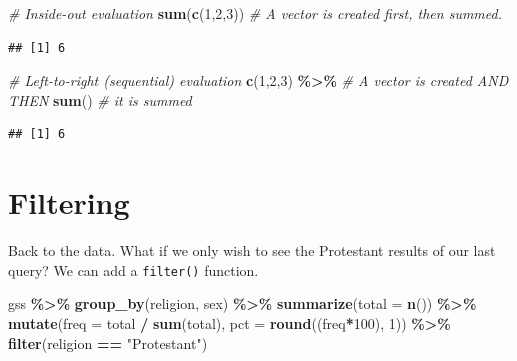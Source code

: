 \documentclass[
]{book}
\newenvironment{Shaded}{\begin{snugshade}}{\end{snugshade}}
\newcommand{\AttributeTok}[1]{\textcolor[rgb]{0.13,0.29,0.53}{#1}}
\newcommand{\CommentTok}[1]{\textcolor[rgb]{0.56,0.35,0.01}{\textit{#1}}}
\newcommand{\DecValTok}[1]{\textcolor[rgb]{0.00,0.00,0.81}{#1}}
\newcommand{\FunctionTok}[1]{\textcolor[rgb]{0.13,0.29,0.53}{\textbf{#1}}}
\newcommand{\NormalTok}[1]{#1}
\newcommand{\SpecialCharTok}[1]{\textcolor[rgb]{0.81,0.36,0.00}{\textbf{#1}}}
\newcommand{\StringTok}[1]{\textcolor[rgb]{0.31,0.60,0.02}{#1}}
\begin{document}
\begin{Shaded}
\begin{Highlighting}[]
\CommentTok{\# Inside{-}out evaluation}
\FunctionTok{sum}\NormalTok{(}\FunctionTok{c}\NormalTok{(}\DecValTok{1}\NormalTok{,}\DecValTok{2}\NormalTok{,}\DecValTok{3}\NormalTok{))               }\CommentTok{\# A vector is created first, then summed.}
\end{Highlighting}
\end{Shaded}

\begin{verbatim}
## [1] 6
\end{verbatim}

\begin{Shaded}
\begin{Highlighting}[]
\CommentTok{\# Left{-}to{-}right (sequential) evaluation}
\FunctionTok{c}\NormalTok{(}\DecValTok{1}\NormalTok{,}\DecValTok{2}\NormalTok{,}\DecValTok{3}\NormalTok{) }\SpecialCharTok{\%\textgreater{}\%}                \CommentTok{\# A vector is created AND THEN}
  \FunctionTok{sum}\NormalTok{()                     }\CommentTok{\# it is summed}
\end{Highlighting}
\end{Shaded}

\begin{verbatim}
## [1] 6
\end{verbatim}

\hypertarget{filtering}{%
\section{Filtering}\label{filtering}}

Back to the data. What if we only wish to see the Protestant results of our last query? We can add a \texttt{filter()} function.

\begin{Shaded}
\begin{Highlighting}[]
\NormalTok{gss }\SpecialCharTok{\%\textgreater{}\%}
  \FunctionTok{group\_by}\NormalTok{(religion, sex) }\SpecialCharTok{\%\textgreater{}\%}
  \FunctionTok{summarize}\NormalTok{(}\AttributeTok{total =} \FunctionTok{n}\NormalTok{()) }\SpecialCharTok{\%\textgreater{}\%}
  \FunctionTok{mutate}\NormalTok{(}\AttributeTok{freq =}\NormalTok{ total }\SpecialCharTok{/} \FunctionTok{sum}\NormalTok{(total),}
         \AttributeTok{pct =} \FunctionTok{round}\NormalTok{((freq}\SpecialCharTok{*}\DecValTok{100}\NormalTok{), }\DecValTok{1}\NormalTok{)) }\SpecialCharTok{\%\textgreater{}\%}
  \FunctionTok{filter}\NormalTok{(religion }\SpecialCharTok{==} \StringTok{"Protestant"}\NormalTok{)}
\end{Highlighting}
\end{Shaded}
\end{document}
